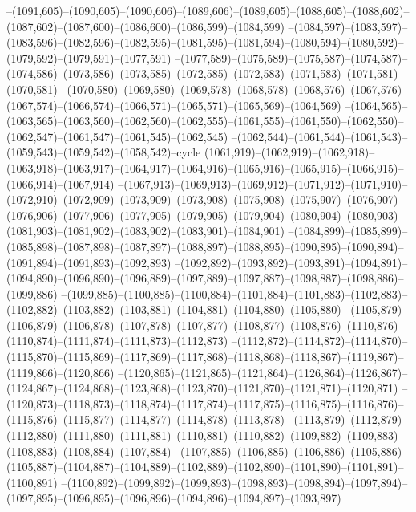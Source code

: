 --(1091,605)--(1090,605)--(1090,606)--(1089,606)--(1089,605)--(1088,605)--(1088,602)--(1087,602)--(1087,600)--(1086,600)--(1086,599)--(1084,599)
--(1084,597)--(1083,597)--(1083,596)--(1082,596)--(1082,595)--(1081,595)--(1081,594)--(1080,594)--(1080,592)--(1079,592)--(1079,591)--(1077,591)
--(1077,589)--(1075,589)--(1075,587)--(1074,587)--(1074,586)--(1073,586)--(1073,585)--(1072,585)--(1072,583)--(1071,583)--(1071,581)--(1070,581)
--(1070,580)--(1069,580)--(1069,578)--(1068,578)--(1068,576)--(1067,576)--(1067,574)--(1066,574)--(1066,571)--(1065,571)--(1065,569)--(1064,569)
--(1064,565)--(1063,565)--(1063,560)--(1062,560)--(1062,555)--(1061,555)--(1061,550)--(1062,550)--(1062,547)--(1061,547)--(1061,545)--(1062,545)
--(1062,544)--(1061,544)--(1061,543)--(1059,543)--(1059,542)--(1058,542)--cycle
(1061,919)--(1062,919)--(1062,918)--(1063,918)--(1063,917)--(1064,917)--(1064,916)--(1065,916)--(1065,915)--(1066,915)--(1066,914)--(1067,914)
--(1067,913)--(1069,913)--(1069,912)--(1071,912)--(1071,910)--(1072,910)--(1072,909)--(1073,909)--(1073,908)--(1075,908)--(1075,907)--(1076,907)
--(1076,906)--(1077,906)--(1077,905)--(1079,905)--(1079,904)--(1080,904)--(1080,903)--(1081,903)--(1081,902)--(1083,902)--(1083,901)--(1084,901)
--(1084,899)--(1085,899)--(1085,898)--(1087,898)--(1087,897)--(1088,897)--(1088,895)--(1090,895)--(1090,894)--(1091,894)--(1091,893)--(1092,893)
--(1092,892)--(1093,892)--(1093,891)--(1094,891)--(1094,890)--(1096,890)--(1096,889)--(1097,889)--(1097,887)--(1098,887)--(1098,886)--(1099,886)
--(1099,885)--(1100,885)--(1100,884)--(1101,884)--(1101,883)--(1102,883)--(1102,882)--(1103,882)--(1103,881)--(1104,881)--(1104,880)--(1105,880)
--(1105,879)--(1106,879)--(1106,878)--(1107,878)--(1107,877)--(1108,877)--(1108,876)--(1110,876)--(1110,874)--(1111,874)--(1111,873)--(1112,873)
--(1112,872)--(1114,872)--(1114,870)--(1115,870)--(1115,869)--(1117,869)--(1117,868)--(1118,868)--(1118,867)--(1119,867)--(1119,866)--(1120,866)
--(1120,865)--(1121,865)--(1121,864)--(1126,864)--(1126,867)--(1124,867)--(1124,868)--(1123,868)--(1123,870)--(1121,870)--(1121,871)--(1120,871)
--(1120,873)--(1118,873)--(1118,874)--(1117,874)--(1117,875)--(1116,875)--(1116,876)--(1115,876)--(1115,877)--(1114,877)--(1114,878)--(1113,878)
--(1113,879)--(1112,879)--(1112,880)--(1111,880)--(1111,881)--(1110,881)--(1110,882)--(1109,882)--(1109,883)--(1108,883)--(1108,884)--(1107,884)
--(1107,885)--(1106,885)--(1106,886)--(1105,886)--(1105,887)--(1104,887)--(1104,889)--(1102,889)--(1102,890)--(1101,890)--(1101,891)--(1100,891)
--(1100,892)--(1099,892)--(1099,893)--(1098,893)--(1098,894)--(1097,894)--(1097,895)--(1096,895)--(1096,896)--(1094,896)--(1094,897)--(1093,897)
